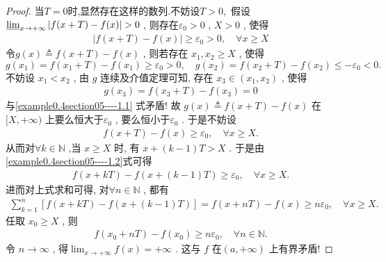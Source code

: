 \documentclass[../../main.tex]{subfiles}
\begin{document}
\begin{proof}
当$T=0$时,显然存在这样的数列.不妨设$T>0,$
假设\(\varliminf_{x \to +\infty} \vert f(x + T) - f(x)\vert > 0\) , 则存在\(\varepsilon_0 > 0\) , \(X > 0\) , 使得
\begin{align}
\vert f(x + T) - f(x)\vert \geqslant \varepsilon_0>0,\quad \forall x \geqslant X \label{example0.4section05----1.1}
\end{align}
令\(g(x) \triangleq f(x + T) - f(x)\) , 则若存在 \(x_1, x_2 \geqslant X\) , 使得
\[g(x_1) = f(x_1 + T) - f(x_1) \geqslant \varepsilon_0 > 0 ,\quad g(x_2) = f(x_2 + T) - f(x_2) \leqslant -\varepsilon_0 < 0. \]
不妨设 \(x_1 < x_2\) , 由 \(g\) 连续及介值定理可知, 存在 \(x_3 \in (x_1, x_2)\) , 使得
\begin{align*}
g(x_3) = f(x_3 + T) - f(x_3) = 0
\end{align*}
与\eqref{example0.4section05----1.1} 式矛盾! 故 \(g(x) \triangleq f(x + T) - f(x)\) 在\([X, +\infty)\) 上要么恒大于\(\varepsilon_0\) , 要么恒小于\(\varepsilon_0\) . 于是不妨设
\begin{align}
f(x + T) - f(x) \geqslant \varepsilon_0,\quad \forall x \geqslant X .\label{example0.4section05----1.2}
\end{align}
从而对\(\forall k \in \mathbb{N}\) ,当 \(x \geqslant X\) 时, 有
\(x + (k - 1)T > X\) .
于是由\eqref{example0.4section05----1.2}式可得
\begin{align*}
f(x + kT) - f(x + (k - 1)T) \geqslant \varepsilon_0,\quad \forall x \geqslant X. 
\end{align*}
进而对上式求和可得, 对\(\forall n \in \mathbb{N}\) , 都有
\begin{align*}
\sum_{k = 1}^n [f(x + kT) - f(x + (k - 1)T)] = f(x + nT) - f(x) \geqslant n\varepsilon_0,\quad \forall x \geqslant X.
\end{align*}
任取 \(x_0 \geqslant X\) , 则
\begin{align*}
f(x_0 + nT) - f(x_0) \geqslant n\varepsilon_0,\quad \forall n \in \mathbb{N}.
\end{align*}
令 \(n \to \infty\) , 得\(\lim_{x \to +\infty} f(x) = +\infty\) . 这与 \(f\) 在\((a, +\infty)\) 上有界矛盾! 

\end{proof}
\end{document}
